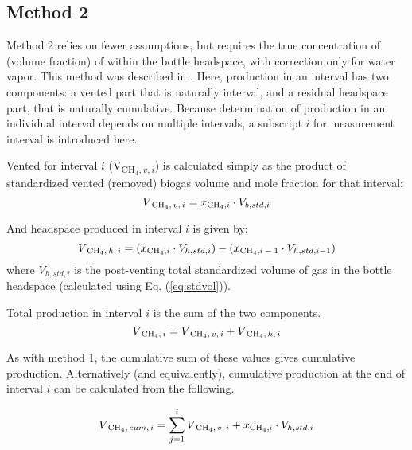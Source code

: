 \documentclass[]{article}
\begin{document}
\subsection{Method 2}
Method 2 relies on fewer assumptions, but requires the true concentration of  (volume fraction) of  within the bottle headspace, with correction only for water vapor.
This method was described in \citet[p 488]{owenBioassayMonitoringBiochemical1979}.
Here,  production in an interval has two components: a vented part that is naturally interval, and a residual headspace part, that is naturally cumulative.
Because determination of  production in an individual interval depends on multiple intervals, a subscript $i$ for measurement interval is introduced here.

Vented  for interval $i$ (V\textsubscript{CH$_4, v, i$}) is calculated simply as the product of standardized vented (removed) biogas volume and  mole fraction for that interval:
\begin{equation}
  V\textsubscript{CH$_4$$,v, i$} = x\textsubscript{CH$_4$,$ i$} \cdot V_{b, std, i}
\end{equation}

And headspace  produced in interval $i$ is given by:
\begin{equation}
  V\textsubscript{CH$_4$$, h, i$} = (x\textsubscript{CH$_4$,$ i$} \cdot V_{h, std, i}) - (x\textsubscript{CH$_4$,$ i-1$} \cdot V_{h, std, i-1})
\end{equation}
where $V_{h, std, i}$ is the post-venting total standardized volume of gas in the bottle headspace (calculated using Eq. (\ref{eq:stdvol})).

Total production in interval $i$ is the sum of the two components.
\begin{equation}
  V\textsubscript{CH$_4$$, i$} = V\textsubscript{CH$_4$$, v, i$} + V\textsubscript{CH$_4$$, h, i$}
\end{equation}

As with method 1, the cumulative sum of these values gives cumulative  production.
Alternatively (and equivalently), cumulative  production at the end of interval $i$ can be calculated from the following.

\begin{equation}
  V\textsubscript{CH$_4$$, cum, i$} = \sum_{j = 1}^i {V\textsubscript{CH$_4$$, v, i$}} +  x\textsubscript{CH$_4$,$ i$} \cdot V_{h, std, i}
\end{equation}


\end{document}
